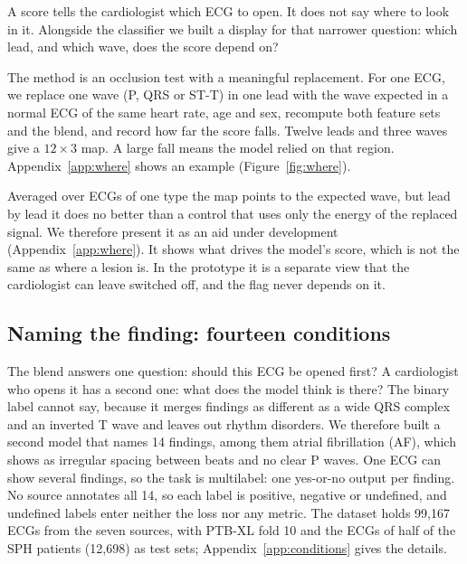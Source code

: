 \documentclass[letterpaper,11pt]{article}
\begin{document}
A score tells the cardiologist which ECG to open. It does not say where to look in it. Alongside the classifier we built a display for that narrower question: which lead, and which wave, does the score depend on?

The method is an occlusion test with a meaningful replacement. For one ECG, we replace one wave (P, QRS or ST-T) in one lead with the wave expected in a normal ECG of the same heart rate, age and sex, recompute both feature sets and the blend, and record how far the score falls. Twelve leads and three waves give a $12 \times 3$ map. A large fall means the model relied on that region. Appendix~\ref{app:where} shows an example (Figure~\ref{fig:where}).

Averaged over ECGs of one type the map points to the expected wave, but lead by lead it does no better than a control that uses only the energy of the replaced signal. We therefore present it as an aid under development (Appendix~\ref{app:where}). It shows what drives the model's score, which is not the same as where a lesion is. In the prototype it is a separate view that the cardiologist can leave switched off, and the flag never depends on it.

\subsection{Naming the finding: fourteen conditions}
\label{sec:conditions}

The blend answers one question: should this ECG be opened first? A cardiologist who opens it has a second one: what does the model think is there? The binary label cannot say, because it merges findings as different as a wide QRS complex and an inverted T wave and leaves out rhythm disorders. We therefore built a second model that names 14 findings, among them atrial fibrillation (AF), which shows as irregular spacing between beats and no clear P waves. One ECG can show several findings, so the task is multilabel: one yes-or-no output per finding. No source annotates all 14, so each label is positive, negative or undefined, and undefined labels enter neither the loss nor any metric. The dataset holds 99,167 ECGs from the seven sources, with PTB-XL fold 10 and the ECGs of half of the SPH patients (12,698) as test sets; Appendix~\ref{app:conditions} gives the details.
\end{document}
